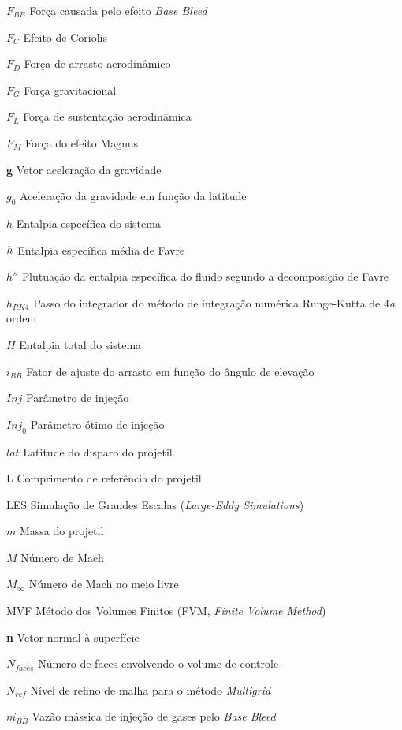 \begin{siglas}
    \item[\(F_{BB}\)] Força causada pelo efeito \textit{Base Bleed}
    \item[\(F_{C}\)] Efeito de Coriolis
    \item[\(F_{D}\)] Força de arrasto aerodinâmico
    \item[\(F_{G}\)] Força gravitacional
    \item[\(F_{L}\)] Força de sustentação aerodinâmica
    \item[\(F_{M}\)] Força do efeito Magnus
    \item[\textbf{g}] Vetor aceleração da gravidade
    \item[\(g_0\)] Aceleração da gravidade em função da latitude
    \item[\(h\)] Entalpia específica do sistema
    \item[\(\Tilde{h}\)] Entalpia específica média de Favre
    \item[\(h''\)] Flutuação da entalpia específica do fluido segundo a decomposição de Favre
    \item[\(h_{RK4}\)] Passo do integrador do método de integração numérica Runge-Kutta de 4\emph{a} ordem
    \item[\(H\)] Entalpia total do sistema
    \item[\(i_{BB}\)] Fator de ajuste do arrasto em função do ângulo de elevação
    \item[\(Inj\)] Parâmetro de injeção
    \item[\(Inj_0\)] Parâmetro ótimo de injeção
    \item[\(lat\)] Latitude do disparo do projetil
    \item[L] Comprimento de referência do projetil
    \item[LES] Simulação de Grandes Escalas (\textit{Large-Eddy Simulations})
    \item[\(m\)] Massa do projetil
    \item[\(M\)] Número de Mach
    \item[\(M_{\infty}\)] Número de Mach no meio livre
    \item[MVF] Método dos Volumes Finitos (FVM, \textit{Finite Volume Method})
    \item[\textbf{n}] Vetor normal à superfície
    \item[\(N_{faces}\)] Número de faces envolvendo o volume de controle
    \item[\(N_{ref}\)] Nível de refino de malha para o método \textit{Multigrid}
    \item[\(\Dot{m_{BB}}\)] Vazão mássica de injeção de gases pelo \textit{Base Bleed}

\end{siglas}
